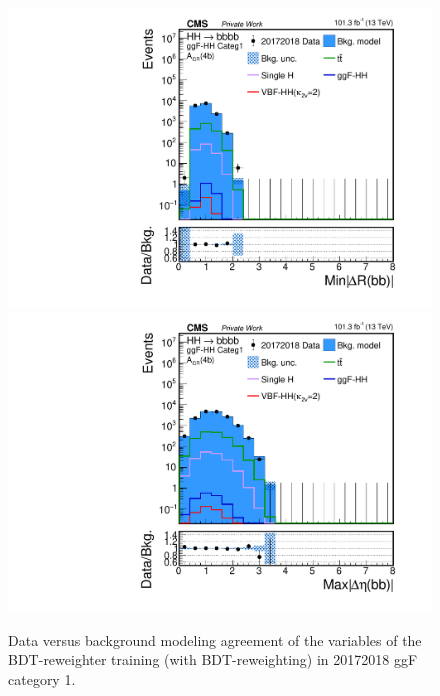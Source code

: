 \begin{figure}[htbp!]
\begin{center}
\includegraphics[width=0.24\linewidth]{Figures/Modeling/background/plotsDatadrivenWithBDT/20172018/GGFcateg1_CR_110/Histogram/plot20172018_min_4b_deltaR_Btag4_GGFcateg1_CR_110_Histogram_log.pdf}
\includegraphics[width=0.24\linewidth]{Figures/Modeling/background/plotsDatadrivenWithBDT/20172018/GGFcateg1_CR_110/Histogram/plot20172018_max_4b_deltaEta_Btag4_GGFcateg1_CR_110_Histogram_log.pdf}
\end{center}
\caption{Data versus background modeling agreement of the variables of the BDT-reweighter training (with BDT-reweighting) in 20172018 ggF category 1.}
\label{bkg:fig:bdtregvarggf1_20172018}
\end{figure}

